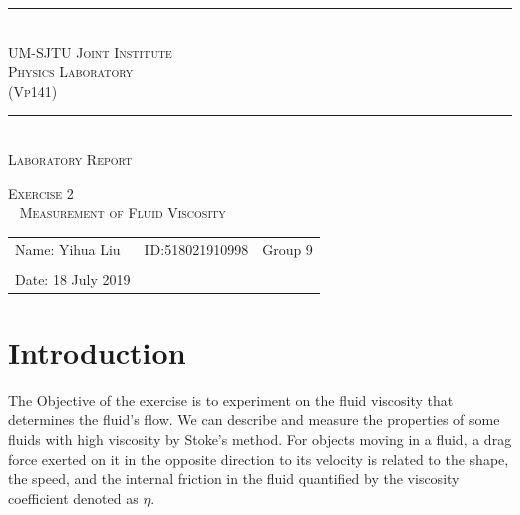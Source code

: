 \documentclass[a4paper]{report}
\begin{document}
	\renewcommand\thesection{\arabic{section}}
	\begin{Large}
		\begin{center}
			\setlength{\baselineskip}{14pt}
			\vspace{1.25cm}
			\rule[0cm]{11.2cm}{0.03em}\\
			\vspace{0.5cm}
			\textsc{UM-SJTU Joint Institute}\\
			\vspace{0.25cm}
			\textsc{Physics Laboratory\\(Vp141)}
			\vspace{0.3cm}
			\rule[0cm]{11.8cm}{0.05em}
			\vspace{4.9cm}\\
			\textsc{Laboratory Report}
		\end{center}
	\end{Large}
	\vspace{0.85cm}
	\begin{large}
		\begin{center}
			\textsc{Exercise 2}
			\\~
			\textsc{Measurement of Fluid Viscosity}
		\end{center}
		\vspace{6cm}
	\end{large}
	\begin{tabular}{l l l}
	Name: Yihua Liu&ID:518021910998&Group 9\\
	&&\\
	Date: 18 July 2019&&\\
	\end{tabular}
	\thispagestyle{empty}
	\newpage
	\section{Introduction}
	The Objective of the exercise is to experiment on the fluid viscosity that determines the fluid's flow. We can describe and measure the properties of some fluids with high viscosity by Stoke's method. For objects moving in a fluid, a drag force exerted on it in the opposite direction to its velocity is related to the shape, the speed, and the internal friction in the fluid quantified by the viscosity coefficient denoted as $\eta$.
	
\end{document}
